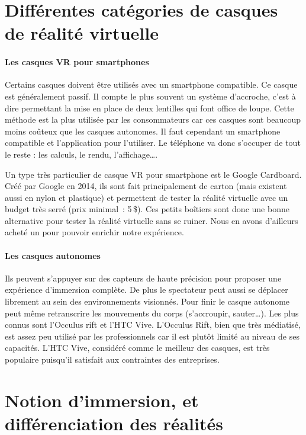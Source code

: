 \documentclass[12pt, a4paper]{report}
\begin{document}
\section[Catégories de casque]{Différentes catégories de casques de réalité virtuelle}

\paragraph{Les casques VR pour smartphones}

Certains casques doivent être utilisés avec un smartphone compatible. Ce casque est généralement passif. Il compte le plus souvent un système d'accroche, c'est à dire permettant la mise en place de deux lentilles qui font office de loupe. Cette méthode est la plus utilisée par les consommateurs car ces casques sont beaucoup moins coûteux que les casques autonomes. Il faut cependant un smartphone compatible et l'application pour l'utiliser. Le téléphone va donc s'occuper de tout le reste : les calculs, le rendu, l'affichage\ldots{}.

Un type très particulier de casque VR pour smartphone est le Google Cardboard. Créé par Google en 2014, ils sont fait principalement de carton (mais existent aussi en nylon et plastique) et permettent de tester la réalité virtuelle avec un budget très serré (prix minimal : 5\,\$). Ces petits boîtiers sont donc une bonne alternative pour tester la réalité virtuelle sans se ruiner. Nous en avons d'ailleurs acheté un pour pouvoir enrichir notre expérience.

\paragraph{Les casques autonomes}

Ils peuvent s'appuyer sur des capteurs de haute précision pour proposer une expérience d'immersion complète. De plus le spectateur peut aussi se déplacer librement au sein des environnements visionnés. Pour finir le casque autonome peut même retranscrire les mouvements du corps (s'accroupir, sauter\ldots{}). Les plus connus sont l'Occulus rift et l'HTC Vive. L'Occulus Rift, bien que très médiatisé, est assez peu utilisé par les professionnels car il est plutôt limité au niveau de ses capacités. L'HTC Vive, considéré comme le meilleur des casques, est très populaire puisqu'il satisfait aux contraintes des entreprises.

\section[Catégories de réalités]{Notion d'immersion, et différenciation des réalités}
\end{document}
